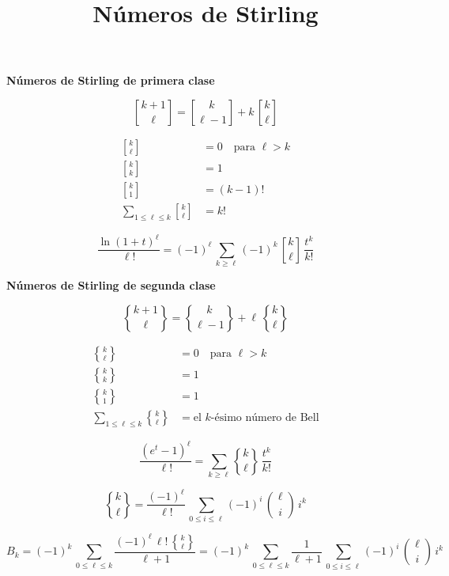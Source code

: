 \documentclass{article}
\title{Números de Stirling}
\date{}
\DeclareRobustCommand{\Stirling}{\genfrac\{\}{0pt}{}}
\DeclareRobustCommand{\stirling}{\genfrac[]{0pt}{}}
\begin{document}
\maketitle

\begin{minipage}[t]{0.5\textwidth}
\begin{center}
\noindent \textbf{Números de Stirling de primera clase}
\end{center}

$$\stirling{k+1}{\ell} = \stirling{k}{\ell-1} + k\,\stirling{k}{\ell}$$

\begin{align*}
\stirling{k}{\ell} & = 0 \quad\text{para }\ell > k\\
\stirling{k}{k} & = 1\\
\stirling{k}{1} & = (k-1)!\\
\sum_{1 \le \ell \le k} \stirling{k}{\ell} & = k!
\end{align*}

$$\frac{\ln (1+t)^\ell}{\ell!} = (-1)^\ell \, \sum_{k \ge \ell} (-1)^k\,\stirling{k}{\ell}\,\frac{t^k}{k!}$$
\end{minipage}
\begin{minipage}[t]{0.5\textwidth}
\begin{center}
\noindent \textbf{Números de Stirling de segunda clase}
\end{center}

$$\Stirling{k+1}{\ell} = \Stirling{k}{\ell-1} + \ell\,\Stirling{k}{\ell}$$

\begin{align*}
\Stirling{k}{\ell} & = 0 \quad\text{para }\ell > k\\
\Stirling{k}{k} & = 1\\
\Stirling{k}{1} & = 1\\
\sum_{1 \le \ell \le k} \Stirling{k}{\ell} & = \text{el }k\text{-ésimo número de Bell}
\end{align*}

$$\frac{(e^t - 1)^\ell}{\ell!} = \sum_{k \ge \ell} \Stirling{k}{\ell}\,\frac{t^k}{k!}$$
\end{minipage}

\vspace{2em}

\[ \Stirling{k}{\ell} = \frac{(-1)^\ell}{\ell!}\,\sum_{0 \le i \le \ell} (-1)^i \, {\ell \choose i} \, i^k \]

\[ B_k = (-1)^k \, \sum_{0 \le \ell \le k} \frac{(-1)^\ell \, \ell! \, \Stirling{k}{\ell}}{\ell+1} = (-1)^k \, \sum_{0 \le \ell \le k} \frac{1}{\ell+1}\,\sum_{0 \le i \le \ell} (-1)^i \, {\ell \choose i} \, i^k \]
\end{document}
